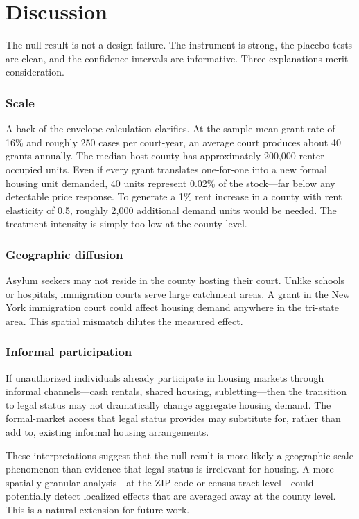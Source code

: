 \documentclass[12pt]{article}
\begin{document}
\section{Discussion}

The null result is not a design failure. The instrument is strong, the placebo tests are clean, and the confidence intervals are informative. Three explanations merit consideration.

\subsubsection*{Scale} A back-of-the-envelope calculation clarifies. At the sample mean grant rate of 16\% and roughly 250 cases per court-year, an average court produces about 40 grants annually. The median host county has approximately 200,000 renter-occupied units. Even if every grant translates one-for-one into a new formal housing unit demanded, 40 units represent 0.02\% of the stock---far below any detectable price response. To generate a 1\% rent increase in a county with rent elasticity of 0.5, roughly 2,000 additional demand units would be needed. The treatment intensity is simply too low at the county level.

\subsubsection*{Geographic diffusion} Asylum seekers may not reside in the county hosting their court. Unlike schools or hospitals, immigration courts serve large catchment areas. A grant in the New York immigration court could affect housing demand anywhere in the tri-state area. This spatial mismatch dilutes the measured effect.

\subsubsection*{Informal participation} If unauthorized individuals already participate in housing markets through informal channels---cash rentals, shared housing, subletting---then the transition to legal status may not dramatically change aggregate housing demand. The formal-market access that legal status provides may substitute for, rather than add to, existing informal housing arrangements.

These interpretations suggest that the null result is more likely a geographic-scale phenomenon than evidence that legal status is irrelevant for housing. A more spatially granular analysis---at the ZIP code or census tract level---could potentially detect localized effects that are averaged away at the county level. This is a natural extension for future work.
\end{document}
